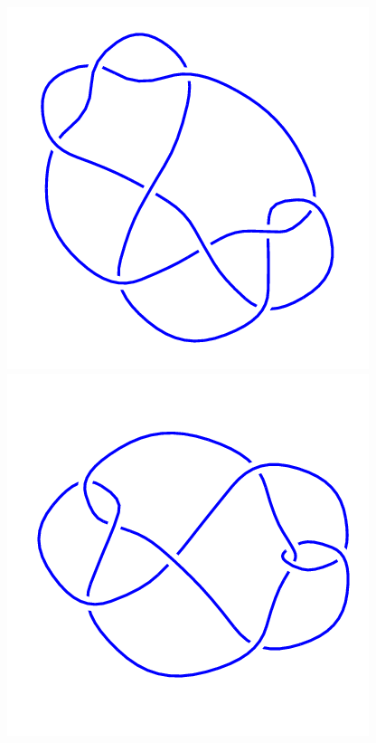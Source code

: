 \begin{figure}[H]
    \begin{minipage}[b]{.18\linewidth}
        \centering
        \includegraphics[width=\linewidth]{../data/9_26.png}
    \end{minipage}
    \begin{minipage}[b]{.18\linewidth}
        \centering
        \includegraphics[width=\linewidth]{../data/9_27.png}

\end{minipage}
\end{figure}
